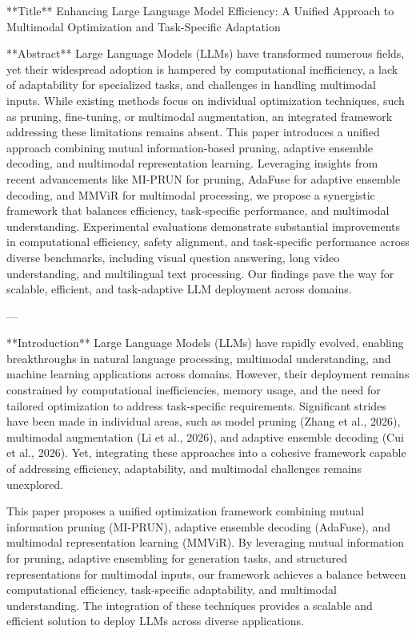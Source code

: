 **Title**  
Enhancing Large Language Model Efficiency: A Unified Approach to Multimodal Optimization and Task-Specific Adaptation  

**Abstract**  
Large Language Models (LLMs) have transformed numerous fields, yet their widespread adoption is hampered by computational inefficiency, a lack of adaptability for specialized tasks, and challenges in handling multimodal inputs. While existing methods focus on individual optimization techniques, such as pruning, fine-tuning, or multimodal augmentation, an integrated framework addressing these limitations remains absent. This paper introduces a unified approach combining mutual information-based pruning, adaptive ensemble decoding, and multimodal representation learning. Leveraging insights from recent advancements like MI-PRUN for pruning, AdaFuse for adaptive ensemble decoding, and MMViR for multimodal processing, we propose a synergistic framework that balances efficiency, task-specific performance, and multimodal understanding. Experimental evaluations demonstrate substantial improvements in computational efficiency, safety alignment, and task-specific performance across diverse benchmarks, including visual question answering, long video understanding, and multilingual text processing. Our findings pave the way for scalable, efficient, and task-adaptive LLM deployment across domains.  

---

**Introduction**  
Large Language Models (LLMs) have rapidly evolved, enabling breakthroughs in natural language processing, multimodal understanding, and machine learning applications across domains. However, their deployment remains constrained by computational inefficiencies, memory usage, and the need for tailored optimization to address task-specific requirements. Significant strides have been made in individual areas, such as model pruning (Zhang et al., 2026), multimodal augmentation (Li et al., 2026), and adaptive ensemble decoding (Cui et al., 2026). Yet, integrating these approaches into a cohesive framework capable of addressing efficiency, adaptability, and multimodal challenges remains unexplored.  

This paper proposes a unified optimization framework combining mutual information pruning (MI-PRUN), adaptive ensemble decoding (AdaFuse), and multimodal representation learning (MMViR). By leveraging mutual information for pruning, adaptive ensembling for generation tasks, and structured representations for multimodal inputs, our framework achieves a balance between computational efficiency, task-specific adaptability, and multimodal understanding. The integration of these techniques provides a scalable and efficient solution to deploy LLMs across diverse applications.  

